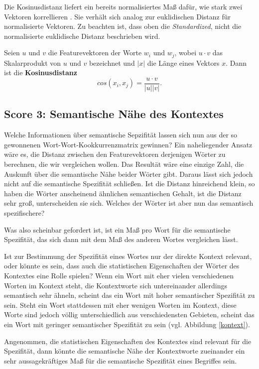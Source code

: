\documentclass[11pt,numbers=noenddot]{scrartcl}
\begin{document}
Die Kosinusdistanz liefert ein bereits normalisiertes Maß dafür, wie stark zwei Vektoren korrellieren \citep[S. 300]{manning1999}. Sie verhält sich analog zur euklidischen Distanz für normalisierte Vektoren. Zu beachten ist, dass oben die \emph{Standardized}, nicht die normalisierte euklidische Distanz beschrieben wird.

Seien $u$ und $v$ die Featurevektoren der Worte $w_i$ und $w_j$, wobei $u \cdot v$ das Skalarprodukt von $u$ und $v$ bezeichnet und $|x|$ die Länge eines Vektors $x$. Dann ist die \textbf{Kosinusdistanz}
$$
    cos(x_i, x_j) = \frac{u \cdot v}{|u||v|}.
$$

\subsection{Score 3: Semantische Nähe des Kontextes} \label{mdcs}

Welche Informationen über semantische Sepzifität lassen sich nun aus der so gewonnenen Wort-Wort-Kookkurrenzmatrix gewinnen? Ein naheliegender Ansatz wäre es, die Distanz zwischen den Featurevektoren derjenigen Wörter zu berechnen, die wir vergleichen wollen. Das Resultät wäre eine einzige Zahl, die Auskunft über die semantische Nähe beider Wörter gibt. Daraus lässt sich jedoch nicht auf die semantische Spezifität schließen. Ist die Distanz hinreichend klein, so haben die Wörter anscheinend ähnlichen semantischen Gehalt, ist die Distanz sehr groß, unterscheiden sie sich. Welches der Wörter ist aber nun das semantisch spezifischere?

Was also scheinbar gefordert ist, ist ein Maß pro Wort für die semantische Spezifität, das sich dann mit dem Maß des anderen Wortes vergleichen lässt.

Ist zur Bestimmung der Spezifität eines Wortes nur der direkte Kontext relevant, oder könnte es sein, dass auch die statistischen Eigenschaften der Wörter des Kontextes eine Rolle spielen? Wenn ein Wort mit eher vielen verschiedenen Worten im Kontext steht, die Kontextworte sich untereinander allerdings semantisch sehr ähneln, scheint das ein Wort mit hoher semantischer Spezifität zu sein. Steht ein Wort stattdessen mit eher wenigen Worten im Kontext, diese Worte sind jedoch völlig unterschiedlich aus verschiedensten Gebieten, scheint das ein Wort mit geringer semantischer Spezifität zu sein (vgl. Abbildung \ref{kontext}).

Angenommen, die statistischen Eigenschaften des Kontextes sind relevant für die Spezifität, dann könnte die semantische Nähe der Kontextworte zueinander ein sehr aussagekräftiges Maß für die semantische Spezifität eines Begriffes sein.
\end{document}
